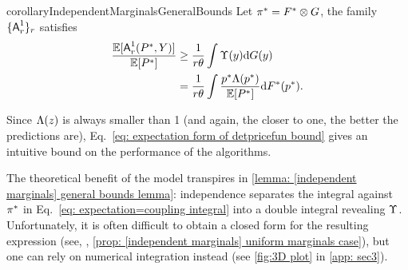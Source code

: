 \begin{restatable}{corollary}{IndependentMarginalsGeneralBounds}\label{lemma: [independent marginals] general bounds lemma}
    Let $\pi^*=F^*\otimes G$, the family $\{\mbox{\textup{\textsf{A}}}^1_r\}_{r}$ satisfies 
    \begin{align}
        \frac{\mathbb{E}[\mbox{\textup{\textsf{A}}}^1_r(P^*,Y)]}{\mathbb{E}[P^*]}&\ge \frac{1}{r\theta} \int\Upsilon(y)\mathrm{d}G(y)
        \, \notag\\
        &=
        \frac{1}{r\theta} \int\frac{p^*\Lambda(p^*)}{\mathbb{E}[P^*]}\mathrm{d}F^*(p^*).
        \label{eq: expectation form of detpricefun bound}
    \end{align}
\end{restatable}
Since $\Lambda(z)$ is always smaller than 1 (and again, the closer to one, the better the predictions are), Eq.~\eqref{eq: expectation form of detpricefun bound} gives an intuitive bound on the performance
of the algorithms.

The theoretical benefit of the model transpires in \cref{lemma: [independent marginals] general bounds lemma}: independence separates the integral against $\pi^*$ in Eq.~\eqref{eq: expectation=coupling integral} into a double integral revealing $\Upsilon$. Unfortunately, it is often difficult to obtain a closed form for the resulting expression (see, \eg, \cref{prop: [independent marginals] uniform marginals case}), but one can rely on numerical integration instead (see \cref{fig:3D plot} in \cref{app: sec3}). 
